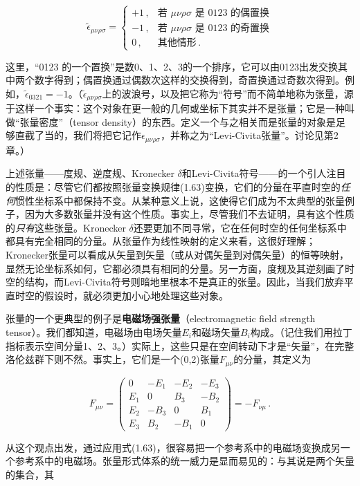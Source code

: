 \begin{equation*}
\tilde{\epsilon}_{\mu\nu\rho\sigma}=
\begin{cases}
+1\,, & \text{若 }\mu\nu\rho\sigma\text{ 是 0123 的偶置换}\\
-1\,, & \text{若 }\mu\nu\rho\sigma\text{ 是 0123 的奇置换}\\
0\,, & \text{其他情形}\,.
\end{cases}
\tag{1.68}
\end{equation*}

这里，“0123 的一个置换”是数0、1、2、3的一个排序，它可以由0123出发交换其中两个数字得到；偶置换通过偶数次这样的交换得到，奇置换通过奇数次得到。例如，$\tilde{\epsilon}_{0321}=-1$。（$\tilde{\epsilon}_{\mu\nu\rho\sigma}$上的波浪号，以及把它称为“符号”而不简单地称为张量，源于这样一个事实：这个对象在更一般的几何或坐标下其实并不是张量；它是一种叫做“张量密度”（tensor density）的东西。定义一个与之相关而是张量的对象是足够直截了当的，我们将把它记作$\epsilon_{\mu\nu\rho\sigma}$，并称之为“Levi-Civita张量”。讨论见第2章。）

上述张量——度规、逆度规、Kronecker $\delta$和Levi-Civita符号——的一个引人注目的性质是：尽管它们都按照张量变换规律(1.63)变换，它们的分量在平直时空的\emph{任何}惯性坐标系中都保持不变。从某种意义上说，这使得它们成为不太典型的张量例子，因为大多数张量并没有这个性质。事实上，尽管我们不去证明，具有这个性质的\emph{只有}这些张量。Kronecker $\delta$还要更加不同寻常，它在任何时空的任何坐标系中都具有完全相同的分量。从张量作为线性映射的定义来看，这很好理解；Kronecker张量可以看成从矢量到矢量（或从对偶矢量到对偶矢量）的恒等映射，显然无论坐标系如何，它都必须具有相同的分量。另一方面，度规及其逆刻画了时空的结构，而Levi-Civita符号则暗地里根本不是真正的张量。因此，当我们放弃平直时空的假设时，就必须更加小心地处理这些对象。

张量的一个更典型的例子是\textbf{电磁场强张量}（electromagnetic field strength tensor）。我们都知道，电磁场由电场矢量$E_i$和磁场矢量$B_i$构成。（记住我们用拉丁指标表示空间分量1、2、3。）实际上，这些只是在空间转动下才是“矢量”，在完整洛伦兹群下则不然。事实上，它们是一个(0,2)张量$F_{\mu\nu}$的分量，其定义为

\begin{equation*}
F_{\mu\nu}=
\begin{pmatrix}
0 & -E_1 & -E_2 & -E_3\\
E_1 & 0 & B_3 & -B_2\\
E_2 & -B_3 & 0 & B_1\\
E_3 & B_2 & -B_1 & 0
\end{pmatrix}
=-F_{\nu\mu}\,.
\tag{1.69}
\end{equation*}

从这个观点出发，通过应用式(1.63)，很容易把一个参考系中的电磁场变换成另一个参考系中的电磁场。张量形式体系的统一威力是显而易见的：与其说是两个矢量的集合，其
